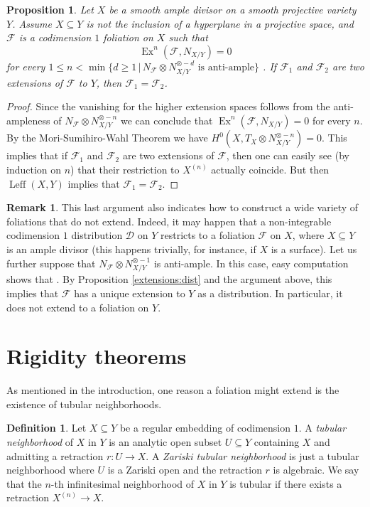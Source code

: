 \documentclass[reqno]{amsart}
\theoremstyle{plain}
\newcommand{\F}{\mathscr{F}}
\newcommand{\PP}{\mathcal{P}}
\newcommand{\D}{\mathscr{D}}
\DeclareMathOperator{\Ex}{Ex}
\DeclareMathOperator{\Leff}{Leff}
\newcounter{Theorem}
\newtheorem{proposition}[theorem]{Proposition}
\theoremstyle{definition}
\newtheorem{definition}[theorem]{Definition}
\newtheorem{remark}[theorem]{Remark}
\theoremstyle{named}
\begin{document}
\begin{proposition}\label{uniqueness}
    Let $X$ be a smooth ample divisor on a smooth projective variety $Y$. Assume $X\subseteq Y$ is not the inclusion of a hyperplane in a projective space, and $\F$ is a codimension $1$ foliation on $X$ such that
    $$ \Ex^n(\F,N_{X/Y})=0$$
    for every $1\leqslant n< \min\big\{ d\geqslant 1 \,\vert \, N_\F\otimes N_{X/Y}^{\otimes -d} \mbox{ is anti-ample}\big\}$ . If $\F_1$ and $\F_2$ are two extensions of $\F$ to $Y$, then $\F_1 = \F_2$.
\end{proposition}
\begin{proof}
Since the vanishing for the higher extension spaces follows from the anti-ampleness of $N_\F\otimes N_{X/Y}^{\otimes -n}$ we can conclude that $\Ex^n(\F,N_{X/Y})=0$ for every $n$. By the Mori-Sumihiro-Wahl Theorem \cite{Wahl} we have $H^0(X,T_X\otimes N_{X/Y}^{\otimes -n})=0$. This implies that if $\F_1$ and $\F_2$ are two extensions of $\F$, then one can easily see (by induction on $n$) that their restriction to $X^{(n)}$ actually coincide. But then $\Leff(X,Y)$ implies that $\F_1=\F_2$.
\end{proof}


\begin{remark}
    This last argument also indicates how to construct a wide variety of foliations that do not extend. Indeed, it may happen that a non-integrable codimension $1$ distribution $\D$ on $Y$ restricts to a foliation $\F$ on $X$, where $X\subseteq Y$ is an ample divisor (this happens trivially, for instance, if $X$ is a surface). Let us further suppose that $N_\F\otimes N_{X/Y}^{\otimes -1}$ is anti-ample. In this case, easy computation shows that \smash{$H^0(X,\PP_{\F,N_{X/Y}^{\otimes - n}})=0$}. By Proposition \ref{extensions:dist} and the argument above, this implies that $\F$ has a unique extension to $Y$ as a distribution. In particular, it does not extend to a foliation on $Y$.
\end{remark}

\section{Rigidity theorems}\label{section6}
As mentioned in the introduction, one reason a foliation might extend is the existence of tubular neighborhoods.

\begin{definition}
 Let $X\subseteq Y$ be a regular embedding of codimension $1$. A \emph{tubular neighborhood} of $X$ in $Y$ is an analytic open subset $U\subseteq Y$ containing $X$ and admitting a retraction $r:U\to X$. 
 A \emph{Zariski tubular neighborhood} is just a tubular neighborhood where $U$ is a Zariski open and the retraction $r$ is algebraic.
 We say that the $n$-th infinitesimal neighborhood of $X$ in $Y$ is tubular if there exists a retraction $X^{(n)}\to X$. 
\end{definition}
\end{document}
